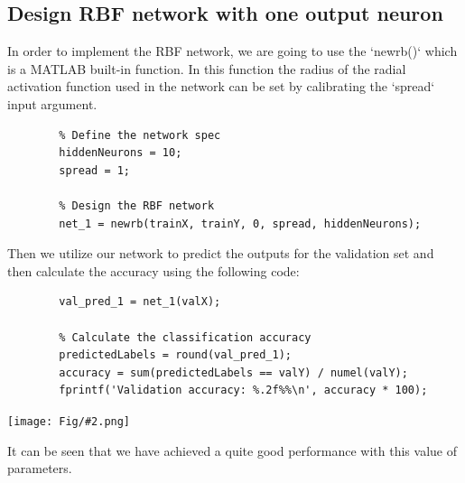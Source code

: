 \documentclass[]{article}
\newcommand{\pict}[2]{\begin{center}
		\texttt{[image: Fig/\#2.png]}
\end{center}}
\begin{document}
	\subsection{Design RBF network with one output neuron}
	In order to implement the RBF network, we are going to use the `newrb()` which is a MATLAB built-in function. In this function the radius of the radial activation function used in the network can be set by calibrating the `spread` input argument.
	\begin{lstlisting}
		% Define the network spec
		hiddenNeurons = 10;
		spread = 1;
		
		% Design the RBF network
		net_1 = newrb(trainX, trainY, 0, spread, hiddenNeurons);
	\end{lstlisting}
	Then we utilize our network to predict the outputs for the validation set and then calculate the accuracy using the following code:
	\begin{lstlisting}
		val_pred_1 = net_1(valX);
		
		% Calculate the classification accuracy
		predictedLabels = round(val_pred_1);
		accuracy = sum(predictedLabels == valY) / numel(valY);
		fprintf('Validation accuracy: %.2f%%\n', accuracy * 100);
	\end{lstlisting}
	\pict{0.4}{F2}
	It can be seen that we have achieved a quite good performance with this value of parameters.
	
\end{document}
